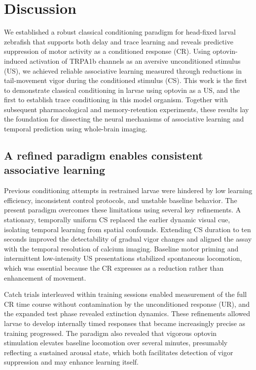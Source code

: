 \section{Discussion}

We established a robust classical conditioning paradigm for head-fixed larval zebrafish that supports both delay and trace learning and reveals predictive suppression of motor activity as a conditioned response (CR). Using optovin-induced activation of TRPA1b channels as an aversive unconditioned stimulus (US), we achieved reliable associative learning measured through reductions in tail-movement vigor during the conditioned stimulus (CS). This work is the first to demonstrate classical conditioning in larvae using optovin as a US, and the first to establish trace conditioning in this model organism. Together with subsequent pharmacological and memory-retention experiments, these results lay the foundation for dissecting the neural mechanisms of associative learning and temporal prediction using whole-brain imaging.

\subsection{A refined paradigm enables consistent associative learning}

Previous conditioning attempts in restrained larvae were hindered by low learning efficiency, inconsistent control protocols, and unstable baseline behavior. The present paradigm overcomes these limitations using several key refinements. A stationary, temporally uniform CS replaced the earlier dynamic visual cue, isolating temporal learning from spatial confounds. Extending CS duration to ten seconds improved the detectability of gradual vigor changes and aligned the assay with the temporal resolution of calcium imaging. Baseline motor priming and intermittent low-intensity US presentations stabilized spontaneous locomotion, which was essential because the CR expresses as a reduction rather than enhancement of movement.

Catch trials interleaved within training sessions enabled measurement of the full CR time course without contamination by the unconditioned response (UR), and the expanded test phase revealed extinction dynamics. These refinements allowed larvae to develop internally timed responses that became increasingly precise as training progressed. The paradigm also revealed that vigorous optovin stimulation elevates baseline locomotion over several minutes, presumably reflecting a sustained arousal state, which both facilitates detection of vigor suppression and may enhance learning itself.

